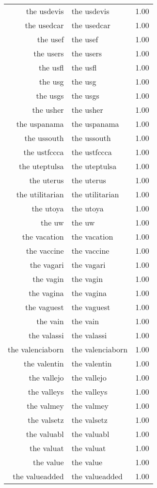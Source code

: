\begin{table}[ht]
\begin{tabular}{rlr}
  the usdevis & the usdevis & 1.00 \\ 
  the usedcar & the usedcar & 1.00 \\ 
  the usef & the usef & 1.00 \\ 
  the users & the users & 1.00 \\ 
  the usfl & the usfl & 1.00 \\ 
  the usg & the usg & 1.00 \\ 
  the usgs & the usgs & 1.00 \\ 
  the usher & the usher & 1.00 \\ 
  the uspanama & the uspanama & 1.00 \\ 
  the ussouth & the ussouth & 1.00 \\ 
  the ustfccca & the ustfccca & 1.00 \\ 
  the uteptulsa & the uteptulsa & 1.00 \\ 
  the uterus & the uterus & 1.00 \\ 
  the utilitarian & the utilitarian & 1.00 \\ 
  the utoya & the utoya & 1.00 \\ 
  the uw & the uw & 1.00 \\ 
  the vacation & the vacation & 1.00 \\ 
  the vaccine & the vaccine & 1.00 \\ 
  the vagari & the vagari & 1.00 \\ 
  the vagin & the vagin & 1.00 \\ 
  the vagina & the vagina & 1.00 \\ 
  the vaguest & the vaguest & 1.00 \\ 
  the vain & the vain & 1.00 \\ 
  the valassi & the valassi & 1.00 \\ 
  the valenciaborn & the valenciaborn & 1.00 \\ 
  the valentin & the valentin & 1.00 \\ 
  the vallejo & the vallejo & 1.00 \\ 
  the valleys & the valleys & 1.00 \\ 
  the valmey & the valmey & 1.00 \\ 
  the valsetz & the valsetz & 1.00 \\ 
  the valuabl & the valuabl & 1.00 \\ 
  the valuat & the valuat & 1.00 \\ 
  the value & the value & 1.00 \\ 
  the valueadded & the valueadded & 1.00 \\ 

\end{tabular}
\end{table}
